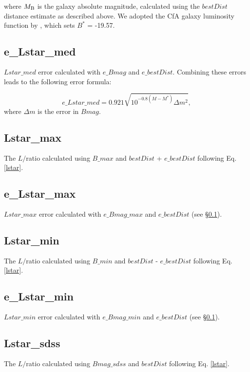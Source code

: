 \noindent where $M_{\rm B}$ is the galaxy absolute magnitude, calculated using the $bestDist$ distance estimate as described above. We adopted the CfA galaxy luminosity function by \citep{marzke1994}, which sets $B^{*} $ = -19.57. 


\subsection{e\_Lstar\_med} \label{e_Lstar_med}
$Lstar\_med$ error calculated with $e\_Bmag$ and $e\_bestDist$. Combining these errors leads to the following error formula:

\begin{equation}
	e\_Lstar\_med = 0.921 \sqrt{10^{-0.8(M - M^*)}  \Delta m^2},
\end{equation}
\noindent where $\Delta m$ is the error in $Bmag$.



\subsection{Lstar\_max}
The $L / $\Lstar  ratio calculated using $B\_max$ and $bestDist$ + $e\_bestDist$ following Eq. \ref{lstar}. \\


\subsection{e\_Lstar\_max}
$Lstar\_max$ error calculated with $e\_Bmag\_max$ and $e\_bestDist$ (see \S \ref{e_Lstar_med}).


\subsection{Lstar\_min}
The $L / $\Lstar ratio calculated using $B\_min$ and $bestDist$ - $e\_bestDist$ following Eq. \ref{lstar}.


\subsection{e\_Lstar\_min}
$Lstar\_min$ error calculated with $e\_Bmag\_min$ and $e\_bestDist$ (see \S \ref{e_Lstar_med}).


\subsection{Lstar\_sdss}
The $L / $\Lstar ratio calculated using $Bmag\_sdss$ and $bestDist$ following Eq. \ref{lstar}.


